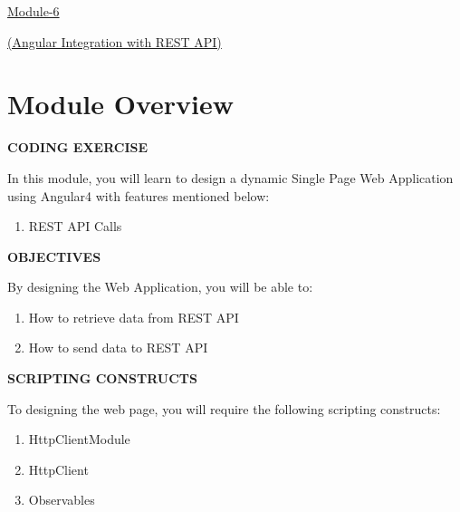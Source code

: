 \documentclass[11pt,twoside]{article}
\begin{document}
\begin{center}
{\Huge \uline{Module-6}}
\end{center}


\begin{center}
{\LARGE \uline{(Angular Integration with REST API)}}
\end{center}

\vspace{2\baselineskip}
\section*{Module Overview}

\vspace{1\baselineskip}

\textbf{CODING EXERCISE}

\vspace{1\baselineskip}
In this module, you will learn to design a dynamic Single Page Web Application using Angular4 with features mentioned below:

\begin{enumerate}
  \item{REST API Calls}
\end{enumerate}

\vspace{1\baselineskip}
\textbf{OBJECTIVES}

\vspace{1\baselineskip}
By designing the Web Application, you will be able to:

\begin{enumerate}
  \item How to retrieve data from REST API

  \item How to send data to REST API

\end{enumerate}
\vspace{1\baselineskip}
\textbf{SCRIPTING CONSTRUCTS}

\vspace{1\baselineskip}
To designing the web page, you will require the following scripting constructs:

\begin{enumerate}
  \item HttpClientModule

  \item HttpClient

  \item Observables

\end{enumerate}
\vspace{17\baselineskip}
\end{document}
